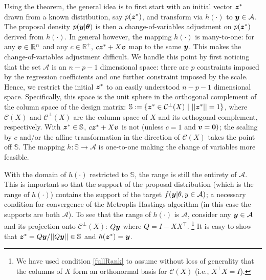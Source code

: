 \documentclass[12pt]{article}
\def\bth{\mbox{\boldmath $\theta$}}
\newcommand{\by}{\mbox{\boldmath $y$}}
\newcommand{\bz}{\mbox{\boldmath $z$}}
\newcommand{\bv}{\mbox{\boldmath $v$}}
\newcommand{\bb}{\mbox{\boldmath $b$}}
\newcommand{\mc}{\mathcal}
\begin{document}
Using the theorem, the general idea is to first start with an initial vector $\bz^*$ drawn from a known distribution, say $p(\bz^*)$, and transform via $h(\cdot)$ to $\by \in \mathcal{A}$. The proposal density $p(\by|\bth)$ is then a change-of-variables adjustment on $p(\bz^*)$ derived from $h(\cdot)$.
In general however, the mapping $h(\cdot)$ is many-to-one: for any $\bv\in \mathbb{R}^{n}$ and any $c\in \mathbb{R}^{+}$, $c\bz^{*} + X\bv$ map to the same $\by$. This makes the change-of-variables adjustment difficult.
We handle this point by first noticing that the set $\mathcal{A}$ is an $n - p - 1$ dimensional space:  there are $p$ constraints imposed by the regression coefficients and one further constraint imposed by the scale. Hence, we restrict the initial $\bz^*$ to an easily understood $n - p - 1$ dimensional space.  Specifically, this space is  the unit sphere in the orthogonal complement of the column space of the design matrix: $\mathbb{S} := \{\bz^* \in \mathcal{C}^{\perp}(X)\  |\  ||\bz^*|| = 1\}$, where $\mathcal{C}(X)$ and  $\mathcal{C}^{\perp}(X)$ are the column space of $X$ and its orthogonal complement, respectively. With $\bz^{*}\in \mathbb{S}$, $c\bz^{*} + X\bv$ is not (unless $c=1$ and $\bv = \mathbf{0})$; the scaling by $c$ and/or the affine transformation in the direction of $\mathcal{C}(X)$ takes the point off $\mathbb{S}$. The mapping $h: \mathbb{S} \rightarrow \mathcal{A}$ is one-to-one making the change of variables more feasible. 

With the domain of $h(\cdot)$ restricted to  $\mathbb{S}$, the range is still the entirety of $\mathcal{A}$. This is important so that the support of the proposal distribution (which is the range of $h(\cdot)$) contains the support of the target  $f(\by | \theta, y\in \mathcal{A})$; a necessary condition for convergence of the Metroplis-Hastings algorithm (in this case the supports are both $\mathcal{A}$). To see that the range of $h(\cdot)$ is $\mathcal{A}$, consider any $\by \in \mathcal{A}$ and its projection onto $\mathcal{C}^{\perp}(X)$: $Q\by$ where $Q = I - XX^{\top}$. \footnote{We have used condition \ref{fullRank} to assume  without loss of generality  that the columns of $X$ form an orthonormal basis for $\mc{C}(X)$ (i.e., $X^\top X=I$).} It is easy to show that $\bz^{*} = Q\by/||Q\by|| \in \mathbb{S}$ and $h(\bz^{*}) = \by$.
\end{document}

